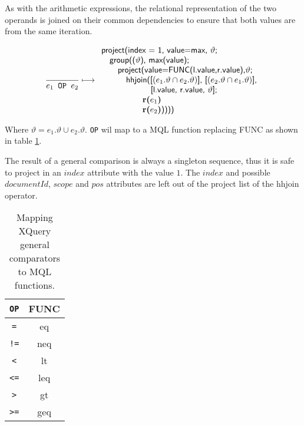 As with the arithmetic expressions, the relational representation of the two operands is joined on their common
dependencies to ensure that both values are from the same iteration.

\begin{equation}
\frac{}{e_1\mbox{\texttt{ OP }}e_2}\longmapsto
\begin{array}{l}
\mbox{\textsf{project(index = 1, value=max, }}\vartheta \textsf{;} \\ \quad
\mbox{\textsf{group((}}\vartheta\mbox{\textsf{), max(value);}} \\ \quad \quad
\mbox{\textsf{project(value=FUNC(l.value,r.value),}}\vartheta\mbox{\textsf{;}} \\ \quad \quad \quad
\mbox{\textsf{hhjoin([}}(e_1.\vartheta\cap e_2.\vartheta)\mbox{\textsf{], [}}(e_2.\vartheta\cap e_1.\vartheta)
\mbox{\textsf{],}} 
\\ \quad \quad \quad \quad \quad \quad\mbox{\textsf{[l.value, r.value, }}\vartheta\mbox{\textsf{];}} \\ \quad \quad
\quad \quad \quad \mbox{\textbf{r(}}e_1\mbox{\textbf{)}} \\ \quad \quad \quad \quad \quad
\mbox{\textbf{r(}}e_2\mbox{\textbf{)}\textsf{))))}}
\end{array}
\label{rule:trans:TD:comparative}
\end{equation}

Where $\vartheta = e_1.\vartheta \cup e_2.\vartheta$. \texttt{OP} wil map to a MQL function replacing
\textsf{FUNC} as shown in table \ref{tab:trans:TD:genCompMap}. 

The result of a general comparison is always a singleton sequence, thus it is safe to project in an $index$
attribute with the value $1$. The $index$ and possible $documentId$, $scope$ and $pos$ attributes are left out of
the project list of the \textsf{hhjoin} operator.

\begin{table}[h]
\centering
\begin{tabular}{c|c}
\texttt{OP} & \textsf{FUNC} \\ \hline
\texttt{=} & \textsf{eq} \\
\texttt{!=} & \textsf{neq} \\
\texttt{<} & \textsf{lt} \\
\texttt{<=} & \textsf{leq} \\
\texttt{>} & \textsf{gt} \\
\texttt{>=} & \textsf{geq} \\
\end{tabular}
\label{tab:trans:TD:genCompMap}
\caption{Mapping XQuery general comparators to MQL functions.}
\end{table}

